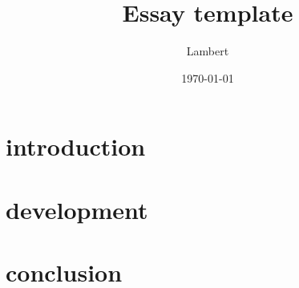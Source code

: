 \documentclass[11pt, a4paper]{article}
\title{Essay template}
\author{Lambert}
\date{\today}
\theoremstyle{definition}
\theoremstyle{plain}
\begin{document}
	
\maketitle

\section{introduction}

\section{development}

\section{conclusion}
\end{document}
